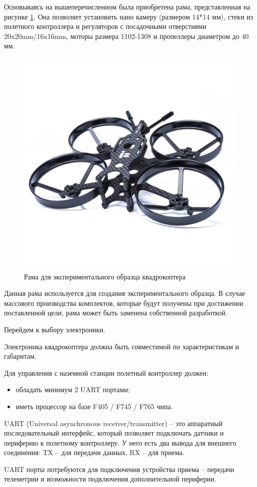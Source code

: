 Основываясь на вышеперечисленном была приобретена рама, представленная на рисунке \ref{fig:frame}. Она позволяет установить нано камеру (размером 14*14 мм), стеки из полетного контроллера и регуляторов с посадочными отверстиями 20x20mm/16x16mm, моторы размера 1102-1308 и пропеллеры диаметром до 40 мм.

\begin{figure}[H]
	\centering
	\includegraphics[width=0.5\linewidth]{../RW/pics/frame}
	\caption{Рама для экспериментального образца квадрокоптера
	}
	\label{fig:frame}
\end{figure}

Данная рама используется для создания экспериментального образца. В случае массового производства комплектов, которые будут получены при достижении поставленной цели, рама может быть заменена собственной разработкой.

Перейдем к выбору электроники.

Электроника квадрокоптера должна быть совместимой по характеристикам и габаритам. 

Для управления с наземной станции полетный контроллер должен:
\begin{itemize}
	\item обладать минимум 2 UART портами;
	\item иметь процессор на базе F405 / F745 / F765 чипа.
\end{itemize}

UART (Universal asynchronous receiver/transmitter) -- это аппаратный последовательный интерфейс, который позволяет подключать датчики и периферию к полетному контроллеру. У него есть два вывода для внешнего соединения: TX -- для передачи данных, RX -- для приема.

UART порты потребуются для подключения устройства приема -- передачи телеметрии и возможности подключения дополнительной периферии.

